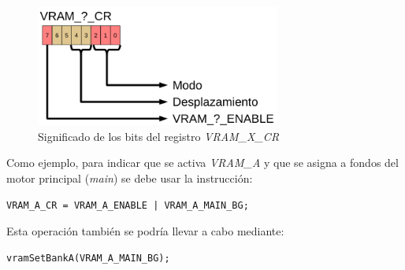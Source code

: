 \begin{figure}[t]
\centering
\includegraphics[height=4cm]{Figuras/C5/c5_reg_vram1.png}
\caption{Significado de los bits del registro \textit{VRAM\_X\_CR}}
\label{fig_c5_reg_vram1}
\end{figure}

Como ejemplo, para indicar que se activa \textit{VRAM\_A} y que se asigna a fondos del motor principal (\textit{main}) se debe usar la instrucción:

\begin{verbatim}
VRAM_A_CR = VRAM_A_ENABLE | VRAM_A_MAIN_BG;
\end{verbatim}

Esta operación también se podría llevar a cabo mediante:

\begin{verbatim}
vramSetBankA(VRAM_A_MAIN_BG);
\end{verbatim}

